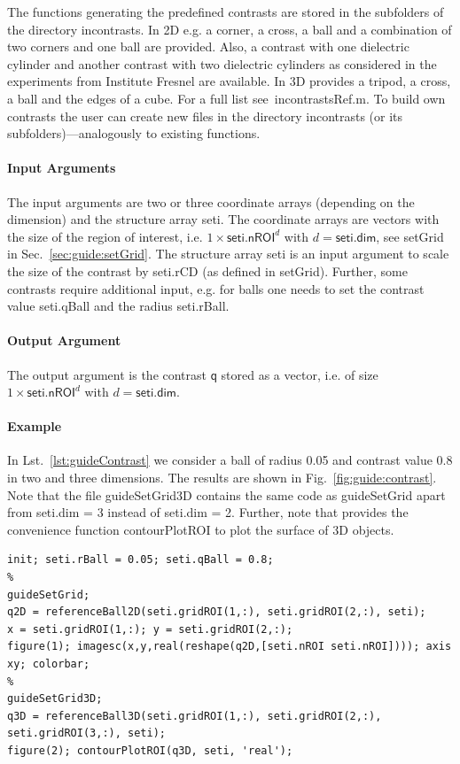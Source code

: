 \documentclass[a4paper]{article}
\begin{document}
The functions generating the predefined contrasts are stored in the subfolders of the directory \textsf{incontrasts}. In 2D e.g. a corner, a cross, a ball and a combination of two corners and one ball are provided. Also, a contrast with one dielectric cylinder and another contrast with two dielectric cylinders as considered in the experiments from Institute Fresnel are available. In 3D \IPscatt provides a tripod, a cross, a ball and the edges of a cube. For a full list see~\textsf{incontrastsRef.m}. 
To build own contrasts the user can create new files in the directory \textsf{incontrasts} (or its subfolders)---analogously to existing functions.

\paragraph{Input Arguments} The input arguments are two or three coordinate arrays (depending on the dimension) and the structure array \textsf{seti}. The coordinate arrays are vectors with the size of the region of interest, i.e. $1 \times \textsf{seti.nROI}^d$ with $d = \textsf{seti.dim}$, see \textsf{setGrid} in Sec.~\ref{sec:guide:setGrid}. The structure array \textsf{seti} is an input argument to scale the size of the contrast by \textsf{seti.rCD} (as defined in \textsf{setGrid}). Further, some contrasts require additional input, e.g. for balls one needs to set the contrast value \textsf{seti.qBall} and the radius \textsf{seti.rBall}.

\paragraph{Output Argument} The output argument is the contrast $\textsf{q}$ stored as a vector, i.e. of size $1 \times \textsf{seti.nROI}^d$ with $d = \textsf{seti.dim}$.

\paragraph{Example} In Lst.~\ref{lst:guideContrast} we consider a ball of radius 0.05 and contrast value 0.8 in two and three dimensions. The results are shown in Fig.~\ref{fig:guide:contrast}. Note that the file \textsf{guideSetGrid3D} contains the same code as \textsf{guideSetGrid} apart from \textsf{seti.dim = 3} instead of \textsf{seti.dim = 2}. Further, note that \IPscatt provides the convenience function \textsf{contourPlotROI} to plot the surface of 3D objects.

\begin{lstlisting}[caption={Predefined contrasts in 2D and 3D (\emph{source code}: \textsf{guides/guideContrast.m}).},label=lst:guideContrast]
init; seti.rBall = 0.05; seti.qBall = 0.8;
%
guideSetGrid;
q2D = referenceBall2D(seti.gridROI(1,:), seti.gridROI(2,:), seti);
x = seti.gridROI(1,:); y = seti.gridROI(2,:);
figure(1); imagesc(x,y,real(reshape(q2D,[seti.nROI seti.nROI]))); axis xy; colorbar;
%
guideSetGrid3D;
q3D = referenceBall3D(seti.gridROI(1,:), seti.gridROI(2,:), seti.gridROI(3,:), seti);
figure(2); contourPlotROI(q3D, seti, 'real');
\end{lstlisting}
\end{document}
